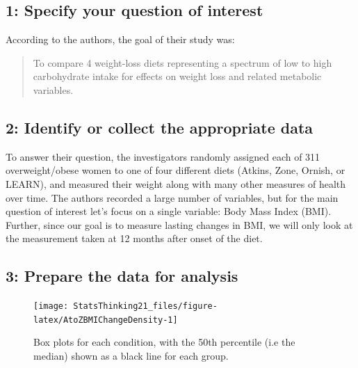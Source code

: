 \documentclass[
  12pt,
]{book}
\begin{document}
\hypertarget{specify-your-question-of-interest}{%
\subsection{1: Specify your question of interest}\label{specify-your-question-of-interest}}

According to the authors, the goal of their study was:

\begin{quote}
To compare 4 weight-loss diets representing a spectrum of low to high carbohydrate intake for effects on weight loss and related metabolic variables.
\end{quote}

\hypertarget{identify-or-collect-the-appropriate-data}{%
\subsection{2: Identify or collect the appropriate data}\label{identify-or-collect-the-appropriate-data}}

To answer their question, the investigators randomly assigned each of 311 overweight/obese women to one of four different diets (Atkins, Zone, Ornish, or LEARN), and measured their weight along with many other measures of health over time. The authors recorded a large number of variables, but for the main question of interest let's focus on a single variable: Body Mass Index (BMI). Further, since our goal is to measure lasting changes in BMI, we will only look at the measurement taken at 12 months after onset of the diet.

\hypertarget{prepare-the-data-for-analysis}{%
\subsection{3: Prepare the data for analysis}\label{prepare-the-data-for-analysis}}

\begin{figure}
\texttt{[image: StatsThinking21\_files/figure-latex/AtoZBMIChangeDensity-1]} \caption{Box plots for each condition, with the 50th percentile (i.e the median) shown as a black line for each group.}\label{fig:AtoZBMIChangeDensity}
\end{figure}
\end{document}
